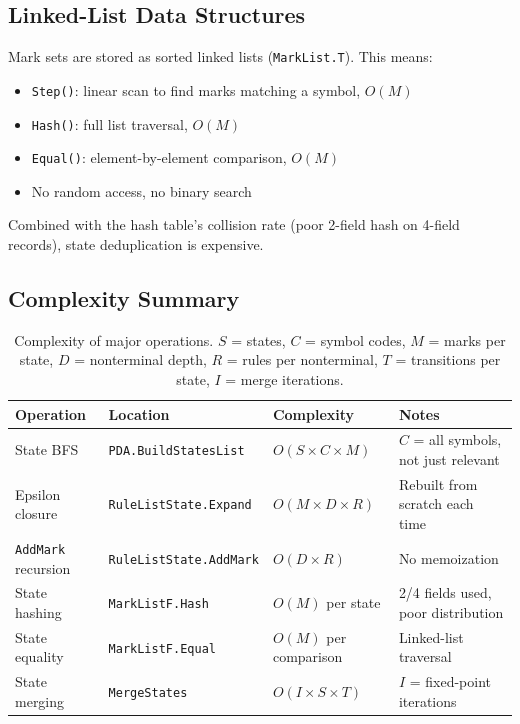 \documentclass[11pt]{article}
\begin{document}
\subsection{Linked-List Data Structures}

Mark sets are stored as sorted linked lists (\texttt{MarkList.T}).
This means:

\begin{itemize}[nosep]
\item \texttt{Step()}: linear scan to find marks matching a symbol, $O(M)$
\item \texttt{Hash()}: full list traversal, $O(M)$
\item \texttt{Equal()}: element-by-element comparison, $O(M)$
\item No random access, no binary search
\end{itemize}

Combined with the hash table's collision rate (poor 2-field hash on
4-field records), state deduplication is expensive.

\subsection{Complexity Summary}

\begin{table}[h]
\centering
\begin{tabular}{@{}llll@{}}
\toprule
Operation & Location & Complexity & Notes \\
\midrule
State BFS & \texttt{PDA.BuildStatesList} & $O(S \times C \times M)$ &
  $C$ = all symbols, not just relevant \\
Epsilon closure & \texttt{RuleListState.Expand} & $O(M \times D \times R)$ &
  Rebuilt from scratch each time \\
\texttt{AddMark} recursion & \texttt{RuleListState.AddMark} & $O(D \times R)$ &
  No memoization \\
State hashing & \texttt{MarkListF.Hash} & $O(M)$ per state &
  2/4 fields used, poor distribution \\
State equality & \texttt{MarkListF.Equal} & $O(M)$ per comparison &
  Linked-list traversal \\
State merging & \texttt{MergeStates} & $O(I \times S \times T)$ &
  $I$ = fixed-point iterations \\
\bottomrule
\end{tabular}
\caption{Complexity of major operations.  $S$ = states, $C$ = symbol codes,
  $M$ = marks per state, $D$ = nonterminal depth, $R$ = rules per
  nonterminal, $T$ = transitions per state, $I$ = merge iterations.}
\end{table}
\end{document}
